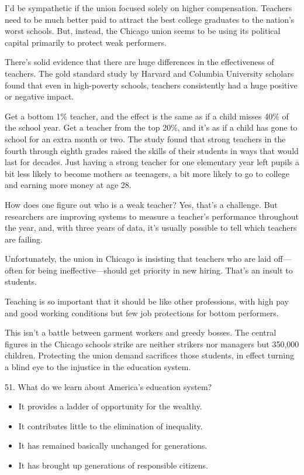 \documentclass[UTF8,11pt]{ctexart}
\begin{document}
I’d be sympathetic if the union focused solely on higher compensation. Teachers need to be much better paid to attract the best college graduates to the nation’s worst schools. But, instead, the Chicago union seems to be using its political capital primarily to protect weak performers.


There’s solid evidence that there are huge differences in the effectiveness of teachers. The gold standard study by Harvard and Columbia University scholars found that even in high-poverty schools, teachers consistently had a huge positive or negative impact.


Get a bottom 1\% teacher, and the effect is the same as if a child misses 40\% of the school year. Get a teacher from the top 20\%, and it’s as if a child has gone to school for an extra month or two. The study found that strong teachers in the fourth through eighth grades raised the skills of their students in ways that would last for decades. Just having a strong teacher for one elementary year left pupils a bit less likely to become mothers as teenagers, a bit more likely to go to college and earning more money at age 28.


How does one figure out who is a weak teacher? Yes, that’s a challenge. But researchers are improving systems to measure a teacher’s performance throughout the year, and, with three years of data, it’s usually possible to tell which teachers are failing.


Unfortunately, the union in Chicago is insisting that teachers who are laid off—often for being ineffective—should get priority in new hiring. That’s an insult to students.


Teaching is so important that it should be like other professions, with high pay and good working conditions but few job protections for bottom performers.


This isn’t a battle between garment workers and greedy bosses. The central figures in the Chicago schools strike are neither strikers nor managers but 350,000 children. Protecting the union demand sacrifices those students, in effect turning a blind eye to the injustice in the education system.


51. What do we learn about America’s education system?


\begin{itemize}[leftmargin=2em,itemsep=.2em,topsep=.4em]\item[A.] It provides a ladder of opportunity for the wealthy.
\item[B.] It contributes little to the elimination of inequality.
\item[C.] It has remained basically unchanged for generations.
\item[D.] It has brought up generations of responsible citizens.
\end{itemize}
\end{document}
